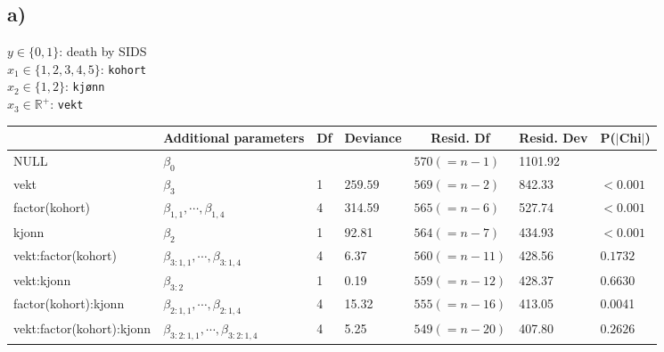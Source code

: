 \documentclass[a4paper]{article}
\begin{document}
\subsection{a)}
$y \in \{0,1\}$: death by SIDS\\
$x_{1} \in \{1,2,3,4,5\}$: \texttt{kohort}\\
$x_{2} \in \{1,2\}$: \texttt{kj{\o}nn}\\
$x_{3} \in \mathbb{R}^{+}$: \texttt{vekt}\\

\begin{table}[ht]
\centering
\begin{tabular}{l|l|l|l|l|l|l|}
\cline{2-7}
\multicolumn{1}{c|}{} & Additional parameters & \multicolumn{1}{c|}{Df} & \multicolumn{1}{c|}{Deviance} & \multicolumn{1}{c|}{Resid. Df} & \multicolumn{1}{c|}{Resid. Dev} & P($\vert$Chi$\vert$) \\ \hline
%
\multicolumn{1}{|l|}{NULL} & $\beta_{0}$ & & & {\color[HTML]{3531FF} $570 (=n-1)$} & {\color[HTML]{3531FF} 1101.92} & \\ \hline
\multicolumn{1}{|l|}{vekt} & $\beta_{3}$ & 1 & $259.59$ & {\color[HTML]{3531FF} $569 (=n-2)$} & {\color[HTML]{3531FF} 842.33} & $< 0.001$ \\ \hline
\multicolumn{1}{|l|}{factor(kohort)} & $\beta_{1,1}, \cdots, \beta_{1,4}$ & 4 & 314.59 & $565 (=n-6)$ & {\color[HTML]{3531FF} 527.74} & $< 0.001$ \\ \hline
\multicolumn{1}{|l|}{kjonn} & $\beta_{2}$ & 1 & 92.81 & $564 (=n-7)$ & {\color[HTML]{3531FF} 434.93} & $< 0.001$ \\ \hline
\multicolumn{1}{|l|}{vekt:factor(kohort)} & $\beta_{3:1,1}, \cdots, \beta_{3:1,4}$ & 4 & 6.37 & $560 (=n-11)$ & {\color[HTML]{3531FF} 428.56} & $0.1732$ \\ \hline
\multicolumn{1}{|l|}{vekt:kjonn} & $\beta_{3:2}$ & 1 & 0.19 & $559 (=n-12)$ & {\color[HTML]{3531FF} 428.37} & $0.6630$ \\ \hline
\multicolumn{1}{|l|}{factor(kohort):kjonn} & $\beta_{2:1,1}, \cdots, \beta_{2:1,4}$ & 4 & 15.32 & $555 (=n-16)$ & {\color[HTML]{3531FF} 413.05} & {\color[HTML]{3531FF} 0.0041} \\ \hline
\multicolumn{1}{|l|}{vekt:factor(kohort):kjonn} & $\beta_{3:2:1,1}, \cdots, \beta_{3:2:1,4}$ & 4 & 5.25 & $549 (=n-20)$ & {\color[HTML]{3531FF} 407.80} & $0.2626$\\ \hline
\end{tabular}
\end{table}
\end{document}
